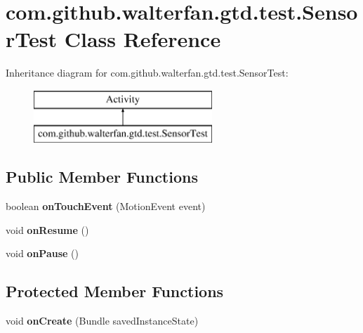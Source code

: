 \hypertarget{classcom_1_1github_1_1walterfan_1_1gtd_1_1test_1_1SensorTest}{\section{com.\-github.\-walterfan.\-gtd.\-test.\-Sensor\-Test Class Reference}
\label{classcom_1_1github_1_1walterfan_1_1gtd_1_1test_1_1SensorTest}
}
Inheritance diagram for com.\-github.\-walterfan.\-gtd.\-test.\-Sensor\-Test\-:\begin{figure}[H]
\begin{center}
\leavevmode
\includegraphics[height=2.000000cm]{classcom_1_1github_1_1walterfan_1_1gtd_1_1test_1_1SensorTest}
\end{center}
\end{figure}
\subsection*{Public Member Functions}
\begin{DoxyCompactItemize}
\item 
\hypertarget{classcom_1_1github_1_1walterfan_1_1gtd_1_1test_1_1SensorTest_a8aa4bd23ffaa67bd31aaae0698688ff4}{boolean {\bfseries on\-Touch\-Event} (Motion\-Event event)}\label{classcom_1_1github_1_1walterfan_1_1gtd_1_1test_1_1SensorTest_a8aa4bd23ffaa67bd31aaae0698688ff4}

\item 
\hypertarget{classcom_1_1github_1_1walterfan_1_1gtd_1_1test_1_1SensorTest_a61c54d54ce42621a35ff9af180e76dd1}{void {\bfseries on\-Resume} ()}\label{classcom_1_1github_1_1walterfan_1_1gtd_1_1test_1_1SensorTest_a61c54d54ce42621a35ff9af180e76dd1}

\item 
\hypertarget{classcom_1_1github_1_1walterfan_1_1gtd_1_1test_1_1SensorTest_aebfa1e75257eabaa49edcf3b19ff2f1c}{void {\bfseries on\-Pause} ()}\label{classcom_1_1github_1_1walterfan_1_1gtd_1_1test_1_1SensorTest_aebfa1e75257eabaa49edcf3b19ff2f1c}

\end{DoxyCompactItemize}
\subsection*{Protected Member Functions}
\begin{DoxyCompactItemize}
\item 
\hypertarget{classcom_1_1github_1_1walterfan_1_1gtd_1_1test_1_1SensorTest_a5accfa4db3a92b45c21abb0b03fdba9e}{void {\bfseries on\-Create} (Bundle saved\-Instance\-State)}\label{classcom_1_1github_1_1walterfan_1_1gtd_1_1test_1_1SensorTest_a5accfa4db3a92b45c21abb0b03fdba9e}

\end{DoxyCompactItemize}


